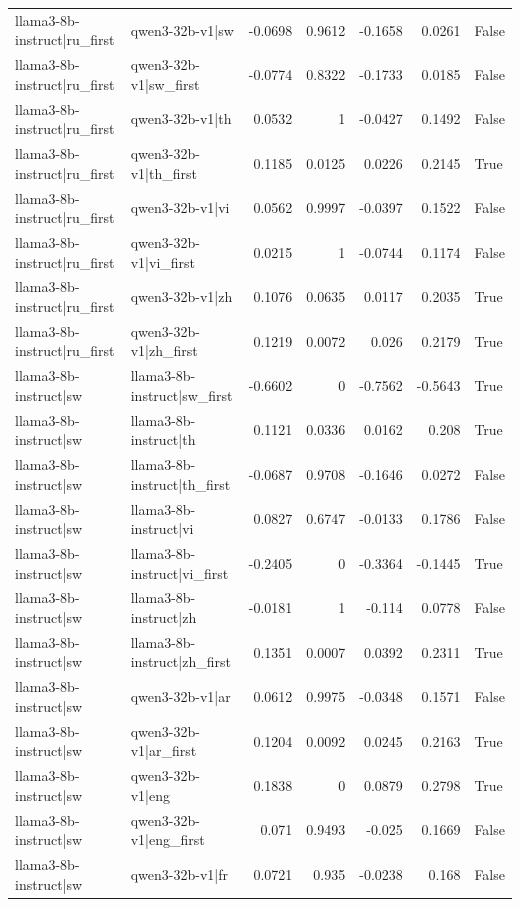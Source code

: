 \begin{table}
\begin{tabular}{l l r r r r l}
llama3-8b-instruct|ru_first & qwen3-32b-v1|sw & -0.0698 & 0.9612 & -0.1658 & 0.0261 & False \\
llama3-8b-instruct|ru_first & qwen3-32b-v1|sw_first & -0.0774 & 0.8322 & -0.1733 & 0.0185 & False \\
llama3-8b-instruct|ru_first & qwen3-32b-v1|th & 0.0532 & 1 & -0.0427 & 0.1492 & False \\
llama3-8b-instruct|ru_first & qwen3-32b-v1|th_first & 0.1185 & 0.0125 & 0.0226 & 0.2145 & True \\
llama3-8b-instruct|ru_first & qwen3-32b-v1|vi & 0.0562 & 0.9997 & -0.0397 & 0.1522 & False \\
llama3-8b-instruct|ru_first & qwen3-32b-v1|vi_first & 0.0215 & 1 & -0.0744 & 0.1174 & False \\
llama3-8b-instruct|ru_first & qwen3-32b-v1|zh & 0.1076 & 0.0635 & 0.0117 & 0.2035 & True \\
llama3-8b-instruct|ru_first & qwen3-32b-v1|zh_first & 0.1219 & 0.0072 & 0.026 & 0.2179 & True \\
llama3-8b-instruct|sw & llama3-8b-instruct|sw_first & -0.6602 & 0 & -0.7562 & -0.5643 & True \\
llama3-8b-instruct|sw & llama3-8b-instruct|th & 0.1121 & 0.0336 & 0.0162 & 0.208 & True \\
llama3-8b-instruct|sw & llama3-8b-instruct|th_first & -0.0687 & 0.9708 & -0.1646 & 0.0272 & False \\
llama3-8b-instruct|sw & llama3-8b-instruct|vi & 0.0827 & 0.6747 & -0.0133 & 0.1786 & False \\
llama3-8b-instruct|sw & llama3-8b-instruct|vi_first & -0.2405 & 0 & -0.3364 & -0.1445 & True \\
llama3-8b-instruct|sw & llama3-8b-instruct|zh & -0.0181 & 1 & -0.114 & 0.0778 & False \\
llama3-8b-instruct|sw & llama3-8b-instruct|zh_first & 0.1351 & 0.0007 & 0.0392 & 0.2311 & True \\
llama3-8b-instruct|sw & qwen3-32b-v1|ar & 0.0612 & 0.9975 & -0.0348 & 0.1571 & False \\
llama3-8b-instruct|sw & qwen3-32b-v1|ar_first & 0.1204 & 0.0092 & 0.0245 & 0.2163 & True \\
llama3-8b-instruct|sw & qwen3-32b-v1|eng & 0.1838 & 0 & 0.0879 & 0.2798 & True \\
llama3-8b-instruct|sw & qwen3-32b-v1|eng_first & 0.071 & 0.9493 & -0.025 & 0.1669 & False \\
llama3-8b-instruct|sw & qwen3-32b-v1|fr & 0.0721 & 0.935 & -0.0238 & 0.168 & False \\

\end{tabular}
\end{table}
